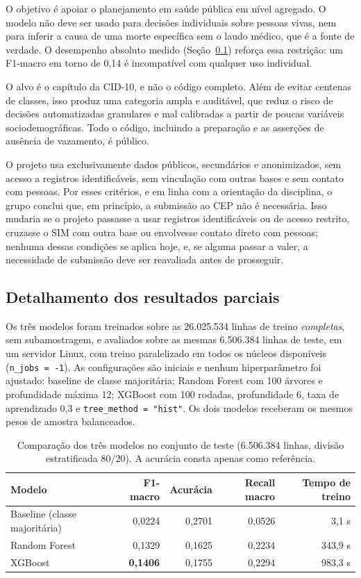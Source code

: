 \documentclass[12pt]{article}
\begin{document}
O objetivo é apoiar o planejamento em saúde pública em nível agregado. O modelo não deve ser usado para decisões individuais sobre pessoas vivas, nem para inferir a causa de uma morte específica sem o laudo médico, que é a fonte de verdade. O desempenho absoluto medido (Seção~\ref{sec:desempenho}) reforça essa restrição: um F1-macro em
torno de 0,14 é incompatível com qualquer uso individual.

O alvo é o capítulo da CID-10, e não o código completo. Além de evitar centenas de classes, isso produz uma categoria ampla e auditável, que reduz o risco de decisões automatizadas granulares e mal calibradas a partir de poucas variáveis sociodemográficas. Todo o código, incluindo a preparação e as asserções de ausência de vazamento, é público.

O projeto usa exclusivamente dados públicos, secundários e anonimizados, sem acesso a registros identificáveis, sem vinculação com outras bases e sem contato com pessoas. Por esses critérios, e em linha com a orientação da disciplina, o grupo conclui que, em princípio, a submissão ao CEP não é necessária. Isso mudaria se o projeto passasse a usar registros identificáveis ou de acesso restrito, cruzasse o SIM com outra base ou envolvesse contato direto com pessoas; nenhuma dessas condições se aplica hoje, e, se alguma passar a valer, a necessidade de submissão deve ser reavaliada antes de prosseguir.

\subsection{Detalhamento dos resultados parciais}
\label{sec:desempenho}

Os três modelos foram treinados sobre as 26.025.534 linhas de treino
\emph{completas}, sem subamostragem, e avaliados sobre as mesmas 6.506.384 linhas de teste, em um servidor Linux, com treino paralelizado em todos os núcleos disponíveis (\texttt{n\_jobs = -1}). As configurações são iniciais e nenhum hiperparâmetro foi ajustado: baseline de classe majoritária; Random Forest com 100 árvores e profundidade máxima 12; XGBoost com 100 rodadas, profundidade 6, taxa de aprendizado 0,3 e \texttt{tree\_method = "hist"}. Os dois modelos receberam os mesmos pesos de amostra balanceados.

\begin{table}[ht]
\centering
\caption{Comparação dos três modelos no conjunto de teste (6.506.384 linhas,
  divisão estratificada 80/20). A acurácia consta apenas como referência.}
\label{tab:comparacao}
\small
\begin{tabular}{|l|r|r|r|r|}
\hline
\textbf{Modelo} & \textbf{F1-macro} & \textbf{Acurácia} & \textbf{Recall macro}
  & \textbf{Tempo de treino} \\
\hline
Baseline (classe majoritária) & 0,0224 & 0,2701 & 0,0526 &     3,1 s \\
Random Forest                 & 0,1329 & 0,1625 & 0,2234 &   343,9 s \\
XGBoost                       & \textbf{0,1406} & 0,1755 & 0,2294 &   983,3 s \\
\hline
\end{tabular}
\end{table}
\end{document}

